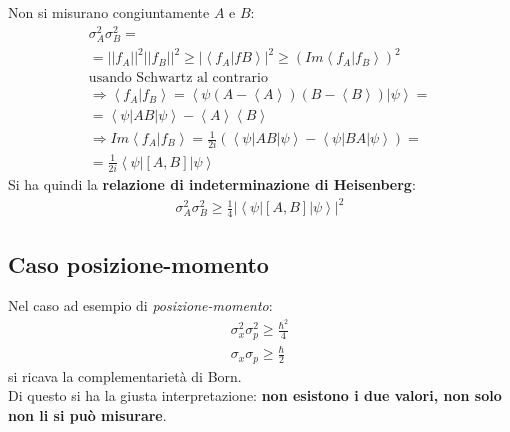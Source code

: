 Non si misurano congiuntamente $A$ e $B$:
\begin{equation}\begin{split}
\sigma_A^2\sigma_B^2=\\
=||f_A||^2||f_B||^2\ge |\left\langle f_A|fB \right\rangle|^2\ge \left(Im\left\langle f_A|f_B \right\rangle\right)^2\\
\textrm{usando Schwartz al contrario}\\
\Longrightarrow \left\langle f_A|f_B \right\rangle=\left\langle \psi \left(A-\left\langle A \right\rangle\right)\left(B-\left\langle B \right\rangle\right)|\psi  \right\rangle=\\
=\left\langle \psi |AB|\psi  \right\rangle-\left\langle A \right\rangle\left\langle B \right\rangle \\
\Longrightarrow Im\left\langle f_A|f_B \right\rangle=\frac{1}{2i}\left(\left\langle \psi |AB|\psi  \right\rangle - \left\langle \psi |BA|\psi  \right\rangle\right)=\\
=\frac{1}{2i}\left\langle \psi |\left[A,B\right]|\psi  \right\rangle
\end{split}\end{equation}
Si ha quindi la \textbf{relazione di indeterminazione di Heisenberg}:
\begin{equation}\begin{split}
\sigma_A^2\sigma_B^2\ge \frac{1}{4}|\left\langle \psi |\left[A,B\right]|\psi  \right\rangle|^2
\end{split}\end{equation}

\subsection{Caso posizione-momento} %
Nel caso ad esempio di \emph{posizione-momento}:
\begin{equation}\begin{split}
\sigma_x^2\sigma_p^2\ge \frac{\hbar ^2}{4} \\
\sigma_x\sigma_p \ge \frac{\hbar }{2}
\end{split}\end{equation}
si ricava la complementarietà di Born. \\
Di questo si ha la giusta interpretazione: \textbf{non esistono i due valori, non solo non li si può misurare}.


